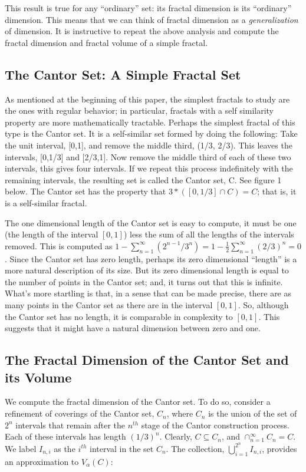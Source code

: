 This result is true for any ``ordinary'' set: its fractal dimension is its
``ordinary'' dimension. This means that we can think of fractal
dimension as a {\it generalization} of dimension. It is 
instructive to repeat the above analysis and compute the fractal dimension 
and fractal volume of a simple fractal.


\subsection{The Cantor Set: A Simple Fractal Set}

As mentioned at the beginning of this paper, the simplest fractals to
study are the ones with regular behavior; in particular, fractals with a
self similarity property are more mathematically tractable. Perhaps
the simplest fractal of this type is 
the Cantor set. It is a self-similar set formed by doing the following:
Take the unit interval, [0,1], and remove the middle third, (1/3,
2/3). This leaves the intervals, [0,1/3] and [2/3,1]. Now remove the
middle third of each of these two intervals, this gives four
intervals.
If we repeat this process indefinitely with the remaining
intervals, the resulting set is called the Cantor set, C. See 
figure 1 below. The Cantor
set has the property that $3 * \left([0,1/3] \cap C\right) = C$; that is, it is a
self-similar fractal. 

The one dimensional length of the Cantor set is
easy to compute, it must be one (the length of the interval $[0,1]$) 
less the sum of all the lengths of the
intervals removed. This is computed as $1
- \sum_{n=1}^\infty (2^{n-1}/3^n) = 1 - \frac{1}{2}
\sum_{n=1}^\infty (2/3)^n = 0$. Since the Cantor set has zero length,
perhaps its zero dimensional ``length'' is a more natural description
of its size. But its zero dimensional length is equal to the 
number of points in the Cantor set; and, it turns out that this is infinite. 
What's more startling is
that, in a sense that can be made precise, there are as many points in
the Cantor set as there are in the interval $[0,1]$. So, although the 
Cantor set has no length, it is comparable in complexity
to $[0,1]$. This suggests that it might have a natural dimension
between zero and one.

\subsection{The Fractal Dimension of the Cantor Set and its Volume}
We compute the fractal dimension of the Cantor set. To do so, 
consider a refinement of coverings of the Cantor set, $C_n$, where
$C_n$ is the union of the set of $2^n$ intervals that remain after 
the $n^{th}$ stage of the Cantor construction process. Each of these 
intervals has length $(1/3)^n$. 
Clearly, $C \subseteq C_n$, and $\cap_{n=1}^\infty
C_n = C$. We label $I_{n,i}$ as the $i^{th}$ interval in the set
$C_n$. The collection, $\bigcup_{i=1}^{2^n} I_{n,i}$, provides an
approximation to $V_\alpha(C)$:


